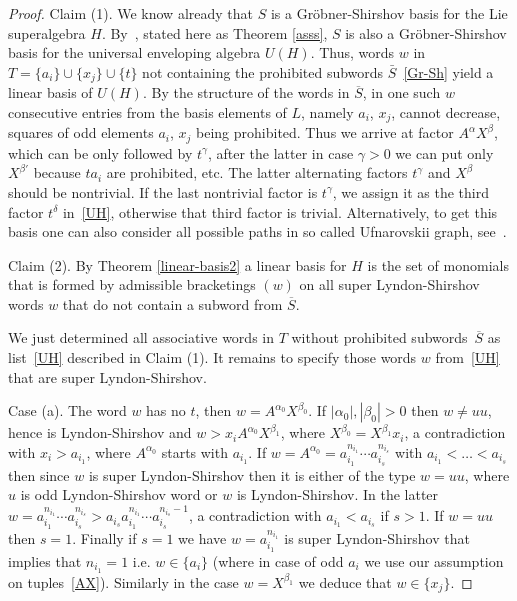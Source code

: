 \documentclass[12pt, reqno]{amsart}
\theoremstyle{remark}
\theoremstyle{definition}
\def\a{\alpha}
\numberwithin{equation}{section}
\begin{document}
\begin{proof}
Claim (1).  We know already that $S$ is a Gr\"obner-Shirshov basis for the Lie superalgebra $H$.
By~\cite[Theorem 2.8]{B-K-L-M}, stated here as Theorem \ref{asss},  $S$  is also a Gr\"obner-Shirshov basis for the universal enveloping algebra $U(H)$.
Thus,  words  $w$ in $T=\{a_i\}\cup \{x_j\}\cup \{t\}$ not containing the prohibited subwords $\bar S$~\eqref{Gr-Sh}
yield a  linear basis of $U(H)$. 
By the structure of  the words  in $\overline S$,
in one such $w$ consecutive  entries from the basis elements of $L$, namely $a_i$, $x_j$, cannot decrease, squares of odd elements $a_i$, $x_j$ being prohibited.
Thus we arrive at factor  $A^\alpha X^\beta$, which can be only followed by $t^\gamma$,
after the latter  in case $\gamma>0$ we can put only $X^{\beta'}$ because $t a_i$ are prohibited, etc.
The latter alternating factors $t^\gamma$ and $X^{\beta}$ should be nontrivial. 
If the last nontrivial factor is $t^\gamma$, we assign it as the third factor $t^\delta$ in~\eqref{UH}, otherwise that third factor is trivial. 
Alternatively, to get this basis one can also consider all possible paths in so called Ufnarovskii graph, see~\cite{Ufn82,Ufn}.

Claim (2). 
By Theorem \ref{linear-basis2} a linear basis for $H$ is the set of monomials that is formed by admissible bracketings $(w)$ on all super Lyndon-Shirshov words $w$ that
do not contain a subword from $\overline{S}$.



We just determined all associative words in $T$ without prohibited subwords~$\overline S$ as list~\eqref{UH} described in Claim (1).
It remains to specify those words $w$  from~\eqref{UH} that are super Lyndon-Shirshov.
 
 Case (a). 
The word  $w$ has no $t$, then  $w=A^{\alpha_0}X^{\beta_0}$. If $|\alpha_0|, |\beta_0| > 0$ then $w \not= u u$, 
hence is Lyndon-Shirshov and  $w >  x_i A^{\alpha_0} X^{\beta_1 }$, where $X^{\beta_0} = X^{\beta_1} x_i$, 
a contradiction with $x_i > a_{i_1}$, where  $A^{\a_0}$ starts with $ a_{i_1}$. 
If $w = A^{\alpha_0} = a_{i_1}^{n_{i_1}}\cdots a_{i_s}^{n_{i_s}}$ with $a_{i_1} < \ldots < a_{i_s}$ then since $w$ is super Lyndon-Shirshov then it is either of the type $w = uu$, where $u$ is odd Lyndon-Shirshov word or $w$ is Lyndon-Shirshov. In the latter $w = a_{i_1}^{n_{i_1}}\cdots a_{i_s}^{n_{i_s}} > a_{i_s} a_{i_1}^{n_{i_1}}\cdots a_{i_s}^{n_{i_s}-1}$, a contradiction with $a_{i_1} < a_{i_s}$ if $s > 1$. If $w = uu$ then $s = 1$. Finally if $s = 1$ we have $w = a_{i_1}^{n_{i_1}}$ is super Lyndon-Shirshov that implies that $n_{i_1} = 1$ i.e. $w \in \{ a_i \}$ (where in case of odd $a_i$ we use our assumption on tuples~\eqref{AX}). 
Similarly in the case $w = X^{\beta_1 }$ we deduce that $w \in \{ x_j \}$.


\end{proof}
\end{document}
